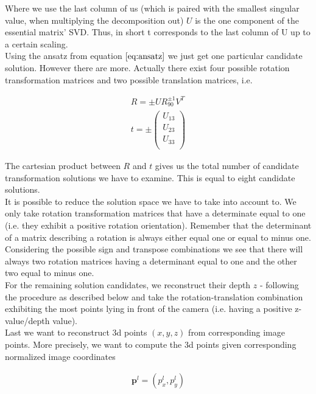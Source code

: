 \documentclass{paper}
\begin{document}
Where we use the last column of us (which is paired with the smallest singular value, when multiplying the decomposition out) $U$ is the one component of the essential matrix' SVD. Thus, in short t corresponds to the last column of U up to a certain scaling. \\

Using the ansatz from equation $\ref{eq:ansatz}$ we just get one particular candidate solution. However there are more. Actually there exist four possible rotation transformation matrices and two possible translation matrices, i.e.

\begin{align}
    R = \pm U R_{90}^{\pm 1} V^{T} \\
    t = \pm 
        \left(\begin{array}{r}
       U_{13} \\
       U_{23} \\  
       U_{33} \\
\end{array} \right)
\end{align}

The cartesian product between $R$ and $t$ gives us the total number of candidate transformation solutions we have to examine. This is equal to eight candidate solutions. \\

It is possible to reduce the solution space we have to take into account to. We only take rotation transformation matrices that have a determinate equal to one (i.e. they exhibit a positive rotation orientation). Remember that the determinant of a matrix describing a rotation is always either equal one or equal to minus one. Considering the possible sign and transpose combinations we see that there will always two rotation matrices having a determinant equal to one and the other two equal to minus one. \\

For the remaining solution candidates, we reconstruct their depth $z$ - following the procedure as described below and take the rotation-translation combination exhibiting the most points lying in front of the camera (i.e. having a positive z-value/depth value). \\

Last we want to reconstruct 3d points $(x,y,z)$ from corresponding image points. More precisely, we want to compute the 3d points given corresponding normalized image coordinates 

\begin{align}
    \textbf{p}^{l} = (p^{l}_{x}, p^{l}_{y})
\end{align}
\end{document}
